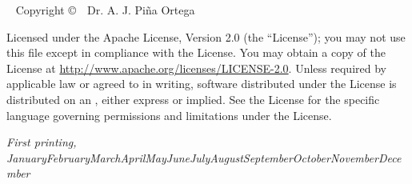 \documentclass[justified]{tufte-book} %
\newcommand{\monthyear}{\ifcase\month\or January\or February\or March\or April\or May\or June\or July\or August\or September\or October\or November\or December\fi\space\number\year} %
\begin{document}
\newpage
\begin{fullwidth}
~\vfill
\thispagestyle{empty}
\setlength{\parindent}{0pt}
\setlength{\parskip}{\baselineskip}
Copyright \copyright\ \the\year\ Dr. A. J. Pi\~{n}a Ortega

\par{}

\par{}

\par Licensed under the Apache License, Version 2.0 (the ``License''); you may not
use this file except in compliance with the License. You may obtain a copy
of the License at \url{http://www.apache.org/licenses/LICENSE-2.0}. Unless
required by applicable law or agreed to in writing, software distributed
under the License is distributed on an , either express or implied. See the
License for the specific language governing permissions and limitations
under the License.

\par\textit{First printing, \monthyear}
\end{fullwidth}


\tableofcontents %


\listoffigures %


\listoftables %



\end{document}
